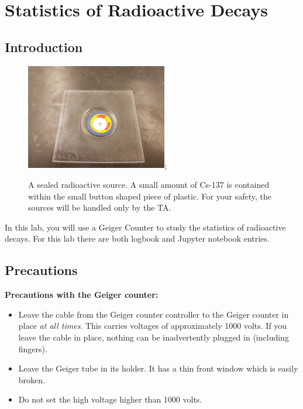 \chapter{Statistics of Radioactive Decays}


\section{Introduction}

\begin{figure}[htbp]
\begin{center}
 \includegraphics[width=0.55\textwidth]{figs/labs/geiger/source.jpg};
\caption{\label{fig:source} A sealed radioactive source.  A small
  amount of Cs-137 is contained within the small button shaped piece
  of plastic.  For your safety, the sources will be handled only by
  the TA.}
\end{center}
\end{figure}

In this lab, you will use a Geiger Counter to study the statistics of
radioactive decays.  For this lab there are both logbook and Jupyter
notebook entries.

\section{Precautions}

\noindent
{\bf Precautions with the Geiger counter:}
\begin{itemize}
\item Leave the cable from the Geiger counter controller to the Geiger
  counter in place {\em at all times}.  This carries voltages of
  approximately 1000 volts.  If you leave the cable in place, nothing
  can be inadvertently plugged in (including fingers).
\item Leave the Geiger tube in its holder.  It has a thin front window
  which is easily broken.
\item Do not set the high voltage higher than 1000 volts.
\end{itemize}

